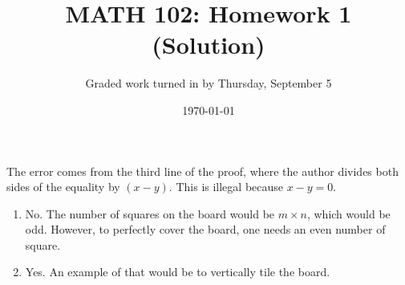 \documentclass[12pt]{amsart}
\title{ MATH 102: Homework 1 (Solution)}
\author{Graded work turned in by Thursday, September 5}
\date{\today}
\begin{document}
\maketitle

\begin{problem}[Exercise 1.2]
The error comes from the third line of the proof, where
the author divides both sides of the equality by $(x-y)$.
This is illegal because $x-y = 0$.
\end{problem}

\begin{problem}[Exercise 1.3]
\begin{enumerate}
	\item No. The number of squares on the board would be $m\times n$,
	      which would be odd. However, to perfectly cover
	      the board, one needs an even number of square.
	\item Yes. An example of that would be to vertically tile the board.
\end{enumerate}
\end{problem}

\begin{problem}[Exercise 1.15]

\end{problem}

\begin{problem}[Exercise 1.20]

\end{problem}



\printbibliography
%
%
\end{document}
